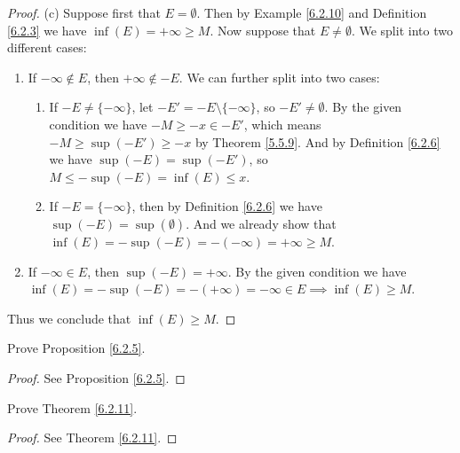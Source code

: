 \begin{proof}{(c)}
    Suppose first that \(E = \emptyset\).
    Then by Example \ref{6.2.10} and Definition \ref{6.2.3} we have \(\inf(E) = +\infty \geq M\).
    Now suppose that \(E \neq \emptyset\).
    We split into two different cases:
    \begin{enumerate}[label=(\Roman*)]
        \item If \(-\infty \not\in E\), then \(+\infty \not\in -E\).
              We can further split into two cases:
              \begin{enumerate}[label=(\roman*)]
                  \item If \(-E \neq \{-\infty\}\), let \(-E' = -E \setminus \{-\infty\}\), so \(-E' \neq \emptyset\).
                        By the given condition we have \(-M \geq -x \in -E'\), which means \(-M \geq \sup(-E') \geq -x\) by Theorem \ref{5.5.9}.
                        And by Definition \ref{6.2.6} we have \(\sup(-E) = \sup(-E')\), so \(M \leq -\sup(-E) = \inf(E) \leq x\).
                  \item If \(-E = \{-\infty\}\), then by Definition \ref{6.2.6} we have \(\sup(-E) = \sup(\emptyset)\).
                        And we already show that \(\inf(E) = -\sup(-E) = -(-\infty) = +\infty \geq M\).
              \end{enumerate}
        \item If \(-\infty \in E\), then \(\sup(-E) = +\infty\).
              By the given condition we have \(\inf(E) = -\sup(-E) = -(+\infty) = -\infty \in E \implies \inf(E) \geq M\).
    \end{enumerate}
    Thus we conclude that \(\inf(E) \geq M\).
\end{proof}

\exercisesection

\begin{exercise}\label{ex 6.2.1}
    Prove Proposition \ref{6.2.5}.
\end{exercise}

\begin{proof}
    See Proposition \ref{6.2.5}.
\end{proof}

\begin{exercise}\label{ex 6.2.2}
    Prove Theorem \ref{6.2.11}.
\end{exercise}

\begin{proof}
    See Theorem \ref{6.2.11}.
\end{proof}